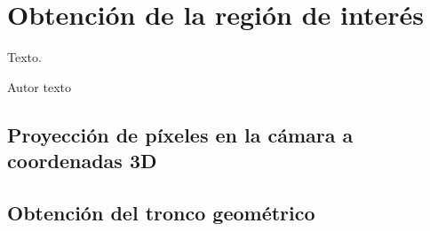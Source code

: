 \chapter{Obtención de la región de interés}
\label{cha:Obtención de la región de interés}

\begin{FraseCelebre}
  \begin{Frase}
    Texto.
  \end{Frase}
  \begin{Fuente}
    Autor texto
  \end{Fuente}
\end{FraseCelebre}

\section{Proyección de píxeles en la cámara a coordenadas 3D}
\label{sec:Proyección de píxeles en la cámara a coordenadas 3D}

\section{Obtención del tronco geométrico}
\label{sec:Obtención del tronco geométrico}
